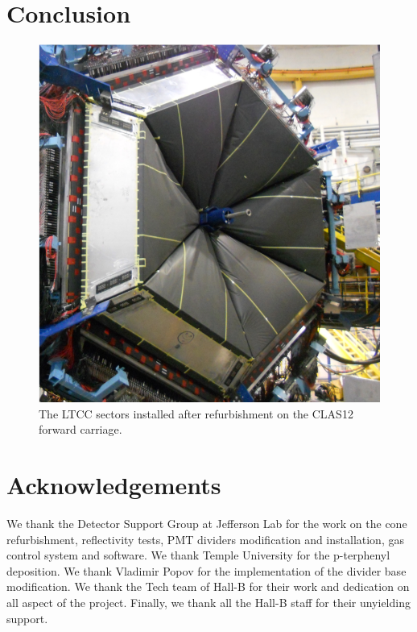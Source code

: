 \section{Conclusion}

\begin{figure}
	\centering
	\includegraphics[width=1.0\columnwidth,keepaspectratio]{img/ltccInstalled.png}
	\caption{The LTCC sectors installed after refurbishment on the CLAS12 forward carriage.}
	\label{fig:ltccInstalled}
\end{figure}


\section{Acknowledgements}

We thank the Detector Support Group at Jefferson Lab for the work on the cone refurbishment, reflectivity tests,
PMT dividers modification and installation, gas control system and software.
We thank Temple University for the p-terphenyl deposition. We thank Vladimir Popov for the implementation
of the divider base modification. We thank the Tech team of Hall-B for their work
and dedication on all aspect of the project. Finally, we thank all the Hall-B staff for their unyielding support.

